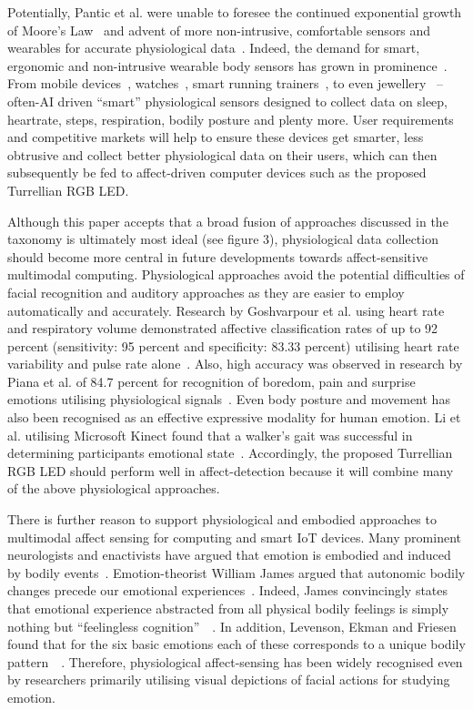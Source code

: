 \documentclass{sigchi}
\begin{document}
Potentially, Pantic et al. were unable to foresee the continued exponential growth of Moore’s Law~\cite{} and advent of more non-intrusive, comfortable sensors and wearables for accurate physiological data~\cite{chen2012making}. Indeed, the demand for smart, ergonomic and non-intrusive wearable body sensors has grown in prominence~\cite{chen2012making}. From mobile devices~\cite{}, watches~\cite{kim2015acceptance}, smart running trainers~\cite{hurford2009types}, to even jewellery~\cite{ju2015smart} – often-AI driven “smart” physiological sensors designed to collect data on sleep, heartrate, steps, respiration, bodily posture and plenty more. User requirements and competitive markets will help to ensure these devices get smarter, less obtrusive and collect better physiological data on their users, which can then subsequently be fed to affect-driven computer devices such as the proposed Turrellian RGB LED. 

Although this paper accepts that a broad fusion of approaches discussed in the taxonomy is ultimately most ideal (see figure 3), physiological data collection should become more central in future developments towards affect-sensitive multimodal computing. Physiological approaches avoid the potential difficulties of facial recognition and auditory approaches as they are easier to employ automatically and accurately. Research by Goshvarpour et al. using heart rate and respiratory volume demonstrated affective classification rates of up to 92 percent (sensitivity: 95 percent and specificity: 83.33 percent) utilising heart rate variability and pulse rate alone~\cite{goshvarpour2017fusion}. Also, high accuracy was observed in research by Piana et al. of 84.7 percent for recognition of boredom, pain and surprise emotions utilising physiological signals~\cite{piana2014real}. Even body posture and movement has also been recognised as an effective expressive modality for human emotion. Li et al. utilising Microsoft Kinect found that a walker’s gait was successful in determining participants emotional state~\cite{li2016emotion}. Accordingly, the proposed Turrellian RGB LED should perform well in affect-detection because it will combine many of the above physiological approaches. 

There is further reason to support physiological and embodied approaches to multimodal affect sensing for computing and smart IoT devices. Many prominent neurologists and enactivists have argued that emotion is embodied and induced by bodily events~\cite{colombetti2008feeling}. Emotion-theorist William James argued that autonomic bodily changes precede our emotional experiences~\cite{james1994physical}. Indeed, James convincingly states that emotional experience abstracted from all physical bodily feelings is simply nothing but “feelingless cognition”~\cite{james1894discussion}~\cite{james1922emotions}. In addition, Levenson, Ekman and Friesen found that for the six basic emotions each of these corresponds to a unique bodily pattern~\cite{levenson1990voluntary}~\cite{prinz2004gut}. Therefore, physiological affect-sensing has been widely recognised even by researchers primarily utilising visual depictions of facial actions for studying emotion.
\end{document}

